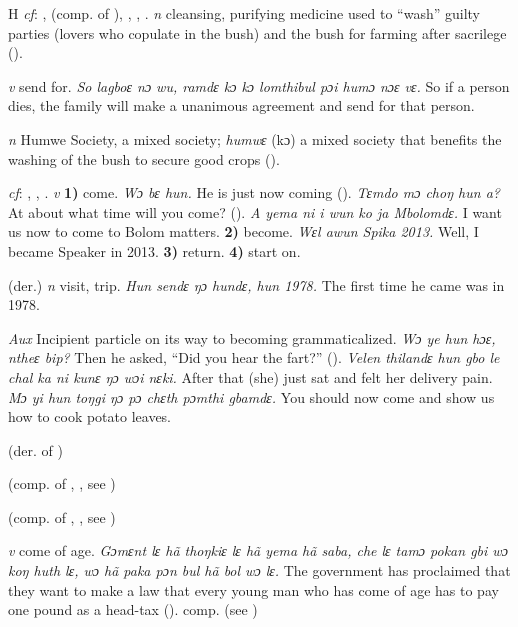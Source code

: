\begin{letter}{H}
 \textit{cf}: ,  (comp. of ), , , . \textit{n} cleansing, purifying medicine used to “wash” guilty parties (lovers who copulate in the bush) and the bush for farming after sacrilege (\citealt{Hall1938}). 

 \textit{v} send for. \textit{So lagboɛ nɔ wu, ramdɛ kɔ kɔ lomthibul pɔi humɔ nɔɛ vɛ.} So if a person dies, the family will make a unanimous agreement and send for that person.

 \textit{n} Humwe Society, a mixed society; \textit{humwɛ} (kɔ) a mixed society that benefits the washing of the bush to secure good crops (\citealt{Pichl1967}). 

 \textit{cf}: , , . \textit{v} \textbf{1)} come. \textit{Wɔ bɛ hun.} He is just now coming (\citealt{Pichl1967}). \textit{Tɛmdo mɔ choŋ hun a?} At about what time will you come? (\citealt{Pichl1967}). \textit{A yema ni i wun ko ja Mbolomdɛ.} I want us now to come to Bolom matters. \textbf{2)} become. \textit{Wɛl awun Spika 2013.} Well, I became Speaker in 2013. \textbf{3)} return. \textbf{4)} start on.

 (der.) \textit{n} visit, trip. \textit{Hun sendɛ ŋɔ hundɛ, hun 1978.} The first time he came was in 1978.

 \textit{Aux} Incipient particle on its way to becoming grammaticalized. \textit{Wɔ ye hun hɔɛ, ntheɛ bip?} Then he asked, “Did you hear the fart?” (\citealt{Pichl1967}). \textit{Velen thilandɛ hun gbo le chal ka ni kunɛ ŋɔ wɔi nɛki.} After that (she) just sat and felt her delivery pain. \textit{Mɔ yi hun toŋgi ŋɔ pɔ chɛth pɔmthi gbamdɛ.} You should now come and show us how to cook potato leaves.

 (der. of ) 

 (comp. of , , see ) 

 (comp. of , , see ) 

 \textit{v} come of age. \textit{Gɔmɛnt lɛ hã thoŋkiɛ lɛ hã yema hã saba, che lɛ tamɔ pokan gbi wɔ koŋ huth lɛ, wɔ hã paka pɔn bul hã bol wɔ lɛ.} The government has proclaimed that they want to make a law that every young man who has come of age has to pay one pound as a head-tax (\citealt{Pichl1967}). comp.  (see ) 


\end{letter}
